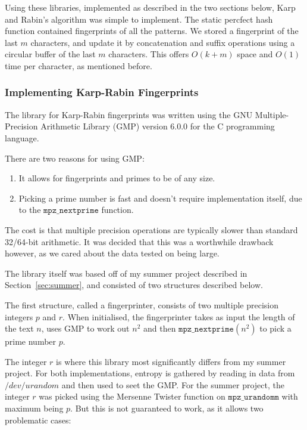 \documentclass[ %
                    author={Dominic Joseph Moylett},
                    degree={MEng},
                     title={Dictionary Matching with Fingerprints},
                  subtitle={An Empirical Analysis},
                      type={Research},
                      year={2014} ]{dissertation}
\begin{document}
Using these libraries, implemented as described in the two sections below, Karp and Rabin's algorithm was simple to implement. The static percfect hash function contained fingerprints of all the patterns. We stored a fingerprint of the last $m$ characters, and update it by concatenation and suffix operations using a circular buffer of the last $m$ characters. This offers $O(k + m)$ space and $O(1)$ time per character, as mentioned before.

\subsubsection{Implementing Karp-Rabin Fingerprints}

The library for Karp-Rabin fingerprints was written using the GNU Multiple-Precision Arithmetic Library (GMP) version 6.0.0 for the C programming language.

There are two reasons for using GMP:
\begin{enumerate}
  \item It allows for fingerprints and primes to be of any size.
  \item Picking a prime number is fast and doesn't require implementation itself, due to the $\texttt{mpz\_nextprime}$ function.
\end{enumerate}

The cost is that multiple precision operations are typically slower than standard 32/64-bit arithmetic. It was decided that this was a worthwhile drawback however, as we cared about the data tested on being large.

The library itself was based off of my summer project described in Section~\ref{sec:summer}, and consisted of two structures described below.

The first structure, called a fingerprinter, consists of two multiple precision integers $p$ and $r$. When initialised, the fingerprinter takes as input the length of the text $n$, uses GMP to work out $n^2$ and then $\texttt{mpz\_nextprime}(n^2)$ to pick a prime number $p$.

The integer $r$ is where this library most significantly differs from my summer project. For both implementations, entropy is gathered by reading in data from $/dev/urandom$ and then used to seet the GMP. For the summer project, the integer $r$ was picked using the Mersenne Twister function on $\texttt{mpz\_urandomm}$ with maximum being $p$. But this is not guaranteed to work, as it allows two problematic cases:
\end{document}
